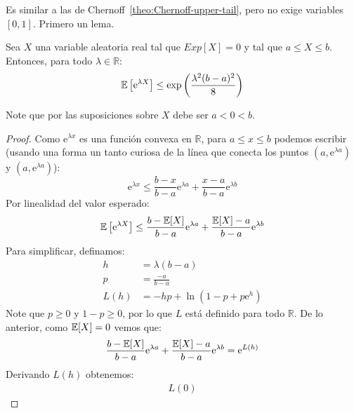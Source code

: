   Es similar a las de Chernoff~\ref{theo:Chernoff-upper-tail},
  pero no exige variables \([0, 1]\).
  Primero un lema.
  \begin{lemma}[Høffding]
    \label{lem:Hoeffding}
    Sea \(X\) una variable aleatoria real tal que \(Exp[X] = 0\)
    y tal que \(a \le X \le b\).
    Entonces,
    para todo \(\lambda \in \mathbb{R}\):
    \begin{equation}
      \label{eq:Hoeffding-lemma}
      \operatorname{\mathbb{E}}\left[ \mathrm{e}^{\lambda X} \right]
        \le \exp\left( \frac{\lambda^2 (b - a)^2}{8} \right)
    \end{equation}
  \end{lemma}
  Note que por las suposiciones sobre \(X\) debe ser \(a < 0 < b\).
  \begin{proof}
    Como \(\mathrm{e}^{\lambda x}\) es una función convexa en \(\mathbb{R}\),
    para \(a \le x \le b\) podemos escribir
    (usando una forma un tanto curiosa de la línea que conecta los puntos
     \((a, \mathrm{e}^{\lambda a})\)
     y \((a, \mathrm{e}^{\lambda a})\)):
     \begin{equation*}
       \mathrm{e}^{\lambda x}
         \le \frac{b - x}{b - a} \mathrm{e}^{\lambda a}
               + \frac{x - a}{b - a} \mathrm{e}^{\lambda b}
     \end{equation*}
     Por linealidad del valor esperado:
     \begin{equation*}
       \operatorname{\mathbb{E}}\left[ \mathrm{e}^{\lambda X} \right]
         \le \frac{b - \operatorname{\mathbb{E}}[X]}{b - a} \mathrm{e}^{\lambda a}
               + \frac{\operatorname{\mathbb{E}}[X] - a}{b - a} \mathrm{e}^{\lambda b}
     \end{equation*}
     Para simplificar,
     definamos:
     \begin{align*}
       h
         &= \lambda (b - a) \\
       p
         &= \frac{-a}{b - a} \\
       L(h)
         &= - h p + \ln(1 - p + p \mathrm{e}^h)
     \end{align*}
     Note que \(p \ge 0\) y \(1 - p \ge 0\),
     por lo que \(L\) está definido para todo \(\mathbb{R}\).
     De lo anterior,
     como \(\operatorname{\mathbb{E}}[X] = 0\) vemos que:
     \begin{align*}
       \frac{b - \operatorname{\mathbb{E}}[X]}{b - a} \mathrm{e}^{\lambda a}
         + \frac{\operatorname{\mathbb{E}}[X] - a}{b - a} \mathrm{e}^{\lambda b}
         = \mathrm{e}^{L(h)}
     \end{align*}
     Derivando \(L(h)\) obtenemos:
     \begin{align*}
       L(0)

\end{align*}
\end{proof}
